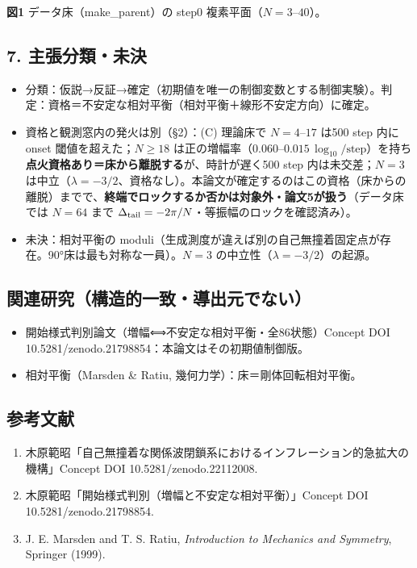 \documentclass[
  a4paper,
]{ltjsarticle}
\providecommand{\tightlist}{%
  \setlength{\itemsep}{0pt}\setlength{\parskip}{0pt}}
\begin{document}
\textbf{図1} データ床（make\_parent）の step0
複素平面（\(N=3\)--\(40\)）。

\subsection{7.
主張分類・未決}\label{ux4e3bux5f35ux5206ux985eux672aux6c7a}

\begin{itemize}
\tightlist
\item
  分類：仮説→反証→確定（初期値を唯一の制御変数とする制御実験）。判定：資格＝不安定な相対平衡（相対平衡＋線形不安定方向）に確定。
\item
  資格と観測窓内の発火は別（§2）：(C) 理論床で \(N=4\)--\(17\) は500
  step 内に onset 閾値を超えた；\(N\ge18\)
  は正の増幅率（\(0.060\)--\(0.015\,\log_{10}/\text{step}\)）を持ち\textbf{点火資格あり＝床から離脱する}が、時計が遅く500
  step 内は未交差；\(N=3\)
  は中立（\(\lambda=-3/2\)、資格なし）。本論文が確定するのはこの資格（床からの離脱）までで、\textbf{終端でロックするか否かは対象外・論文5が扱う}（データ床では
  \(N=64\) まで
  \(\Delta_{\rm tail}=-2\pi/N\)・等振幅のロックを確認済み）。
\item
  未決：相対平衡の
  moduli（生成測度が違えば別の自己無撞着固定点が存在。90°床は最も対称な一員）。\(N=3\)
  の中立性（\(\lambda=-3/2\)）の起源。
\end{itemize}

\subsection{関連研究（構造的一致・導出元でない）}\label{ux95a2ux9023ux7814ux7a76ux69cbux9020ux7684ux4e00ux81f4ux5c0eux51faux5143ux3067ux306aux3044}

\begin{itemize}
\tightlist
\item
  開始様式判別論文（増幅⟺不安定な相対平衡・全86状態）Concept DOI
  10.5281/zenodo.21798854：本論文はその初期値制御版。
\item
  相対平衡（Marsden \& Ratiu, 幾何力学）：床＝剛体回転相対平衡。
\end{itemize}

\subsection{参考文献}\label{ux53c2ux8003ux6587ux732e}

\begin{enumerate}
\def\labelenumi{\arabic{enumi}.}
\tightlist
\item
  木原範昭「自己無撞着な関係波閉鎖系におけるインフレーション的急拡大の機構」Concept
  DOI 10.5281/zenodo.22112008.
\item
  木原範昭「開始様式判別（増幅と不安定な相対平衡）」Concept DOI
  10.5281/zenodo.21798854.
\item
  J. E. Marsden and T. S. Ratiu, \emph{Introduction to Mechanics and
  Symmetry}, Springer (1999).
\end{enumerate}
\end{document}
